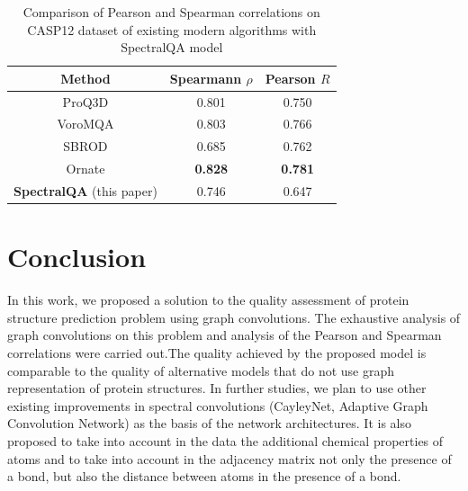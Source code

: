 \documentclass[12pt,twosides]{extarticle}
\begin{document}
\begin{center}
	\begin{table}[H]
		\centering
		\caption{Comparison of Pearson and Spearman correlations on CASP12 dataset of existing modern algorithms with SpectralQA model}
		\begin{tabular}{ccc}
			\hline Method & Spearmann $\rho$ &  Pearson $R$ \\
			\hline ProQ3D & 0.801 & 0.750 \\
			VoroMQA & 0.803 & 0.766  \\
			SBROD & 0.685 & 0.762  \\
			Ornate & \textbf{0.828} & \textbf{0.781}   \\
			\textbf{SpectralQA} (this paper) &   {0.746}&   0.647   \\
			\hline 
		\end{tabular}
		\label{Tab:results}
	\end{table}
\end{center}

\section{Conclusion}
In this work, we proposed a solution to the quality assessment of protein structure prediction problem using graph convolutions. The exhaustive analysis of graph convolutions on this problem and analysis of the Pearson and Spearman correlations were carried out.The quality achieved by the proposed model is comparable to the quality of alternative models that do not use graph representation of protein structures. In further studies, we plan to use other existing improvements in spectral convolutions (CayleyNet, Adaptive Graph Convolution Network) as the basis of the network architectures. It is also proposed to take into account in the data the additional chemical properties of atoms and to take into account in the adjacency matrix not only the presence of a bond, but also the distance between atoms in the presence of a bond.




\nocite{*}
	
\end{document}

